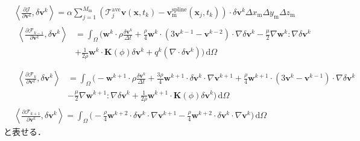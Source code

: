 \begin{align}
    &\left\langle\frac{\partial \mathcal{J}}{\partial \mathbf{v}^k}, \delta \mathbf{v}^k\right\rangle
    = \alpha \sum_{j=1}^{M_\text{m}} \left(\mathcal{T}^{\mathrm{ave}}_{j}\mathbf{v} (\mathbf{x}, t_k) - \mathbf{v}^{\mathrm{spline}}_{\text{m}}(\mathbf{x}_j, t_k)\right) \cdot \delta \mathbf{v}^k \Delta x_{\text{m}} \Delta y_{\text{m}} \Delta z_{\text{m}} \\
    &\begin{aligned}
        \left\langle\frac{\partial \mathcal{F}_{k-1}}{\partial \mathbf{v}^k}, \delta \mathbf{v}^k\right\rangle
        &= \int_{\Omega} \bigg( \mathbf{w}^{k} \cdot \rho\frac{\delta \mathbf{v}^k}{\Delta t} + \frac{\rho}{4} \mathbf{w}^{k} \cdot \left( 3\mathbf{v}^{k-1} - \mathbf{v}^{k-2} \right) \cdot \nabla \delta \mathbf{v}^{k} 
        - \frac{\mu}{2} \nabla \mathbf{w}^{k}: \nabla \delta \mathbf{v}^k \\
        & + \frac{1}{2\rho} \mathbf{w}^{k} \cdot \mathbf{K}(\phi) \delta \mathbf{v}^k + q^{k} (\nabla \cdot \delta \mathbf{v}^{k}) \bigg) \, \mathrm{d}\Omega \\
    \end{aligned} \\
    &\begin{aligned}
        \left\langle\frac{\partial \mathcal{F}_k}{\partial \mathbf{v}^k}, \delta \mathbf{v}^k\right\rangle
        &= \int_{\Omega} \bigg( -\mathbf{w}^{k+1} \cdot \rho \frac{\delta \mathbf{v}^k}{\Delta t} + \frac{3\rho}{4} \mathbf{w}^{k+1} \cdot \delta \mathbf{v}^k \cdot \nabla \mathbf{v}^{k+1} + \frac{\rho}{4} \mathbf{w}^{k+1} \cdot \left( 3\mathbf{v}^k - \mathbf{v}^{k-1} \right) \cdot \nabla \delta \mathbf{v}^{k} \\
        &- \frac{\mu}{2} \nabla \mathbf{w}^{k+1}: \nabla \delta \mathbf{v}^k + \frac{1}{2\rho} \mathbf{w}^{k+1} \cdot \mathbf{K}(\phi) \delta \mathbf{v}^k \bigg) \, \mathrm{d}\Omega
    \end{aligned} \\
    &\left\langle\frac{\partial \mathcal{F}_{k+1}}{\partial \mathbf{v}^k}, \delta \mathbf{v}^k\right\rangle
    = \int_{\Omega} \bigg( - \frac{\rho}{4}\mathbf{w}^{k+2} \cdot \delta \mathbf{v}^{k} \cdot \nabla \mathbf{v}^{k+1} 
    - \frac{\rho}{4} \mathbf{w}^{k+2} \cdot \delta \mathbf{v}^{k} \cdot \nabla \mathbf{v}^{k}\bigg) \, \mathrm{d}\Omega 
\end{align}
と表せる．
